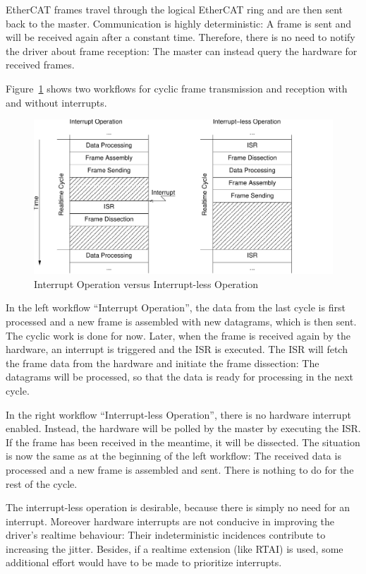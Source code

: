 \documentclass[a4paper,12pt,BCOR6mm,bibtotoc,idxtotoc]{scrbook}
\begin{document}
EtherCAT frames travel through the logical EtherCAT ring and are then
sent back to the master. Communication is highly deterministic: A
frame is sent and will be received again after a constant time.
Therefore, there is no need to notify the driver about frame
reception: The master can instead query the hardware for received
frames.

Figure~\ref{fig:interrupt} shows two workflows for cyclic frame
transmission and reception with and without interrupts.

\begin{figure}[htbp]
  \centering
  \includegraphics[width=.8\textwidth]{images/interrupt}
  \caption{Interrupt Operation versus Interrupt-less Operation}
  \label{fig:interrupt}
\end{figure}

In the left workflow ``Interrupt Operation'', the data from the last
cycle is first processed and a new frame is assembled with new
datagrams, which is then sent.  The cyclic work is done for now.
Later, when the frame is received again by the hardware, an interrupt
is triggered and the ISR is executed. The ISR will fetch the frame
data from the hardware and initiate the frame dissection: The
datagrams will be processed, so that the data is ready for processing
in the next cycle.

In the right workflow ``Interrupt-less Operation'', there is no
hardware interrupt enabled.  Instead, the hardware will be polled by
the master by executing the ISR. If the frame has been received in the
meantime, it will be dissected. The situation is now the same as at
the beginning of the left workflow: The received data is processed and
a new frame is assembled and sent. There is nothing to do for the rest
of the cycle.

The interrupt-less operation is desirable, because there is simply no
need for an interrupt. Moreover hardware interrupts are not conducive
in improving the driver's realtime behaviour: Their indeterministic
incidences contribute to increasing the jitter. Besides, if a realtime
extension (like RTAI) is used, some additional effort would have to be
made to prioritize interrupts.
\end{document}
